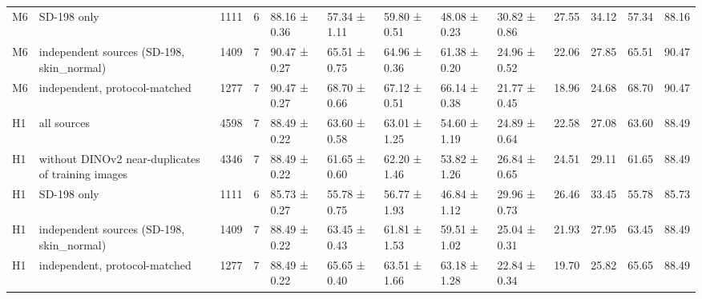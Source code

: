 \begin{tabular}{llrrlllllrrrr}
M6 & SD-198 only & 1111 & 6 & 88.16 ± 0.36 & 57.34 ± 1.11 & 59.80 ± 0.51 & 48.08 ± 0.23 & 30.82 ± 0.86 & 27.55 & 34.12 & 57.34 & 88.16 \\
M6 & independent sources (SD-198, skin\_normal) & 1409 & 7 & 90.47 ± 0.27 & 65.51 ± 0.75 & 64.96 ± 0.36 & 61.38 ± 0.20 & 24.96 ± 0.52 & 22.06 & 27.85 & 65.51 & 90.47 \\
M6 & independent, protocol-matched & 1277 & 7 & 90.47 ± 0.27 & 68.70 ± 0.66 & 67.12 ± 0.51 & 66.14 ± 0.38 & 21.77 ± 0.45 & 18.96 & 24.68 & 68.70 & 90.47 \\
H1 & all sources & 4598 & 7 & 88.49 ± 0.22 & 63.60 ± 0.58 & 63.01 ± 1.25 & 54.60 ± 1.19 & 24.89 ± 0.64 & 22.58 & 27.08 & 63.60 & 88.49 \\
H1 & without DINOv2 near-duplicates of training images & 4346 & 7 & 88.49 ± 0.22 & 61.65 ± 0.60 & 62.20 ± 1.46 & 53.82 ± 1.26 & 26.84 ± 0.65 & 24.51 & 29.11 & 61.65 & 88.49 \\
H1 & SD-198 only & 1111 & 6 & 85.73 ± 0.27 & 55.78 ± 0.75 & 56.77 ± 1.93 & 46.84 ± 1.12 & 29.96 ± 0.73 & 26.46 & 33.45 & 55.78 & 85.73 \\
H1 & independent sources (SD-198, skin\_normal) & 1409 & 7 & 88.49 ± 0.22 & 63.45 ± 0.43 & 61.81 ± 1.53 & 59.51 ± 1.02 & 25.04 ± 0.31 & 21.93 & 27.95 & 63.45 & 88.49 \\
H1 & independent, protocol-matched & 1277 & 7 & 88.49 ± 0.22 & 65.65 ± 0.40 & 63.51 ± 1.66 & 63.18 ± 1.28 & 22.84 ± 0.34 & 19.70 & 25.82 & 65.65 & 88.49 \\
\bottomrule
\end{tabular}
